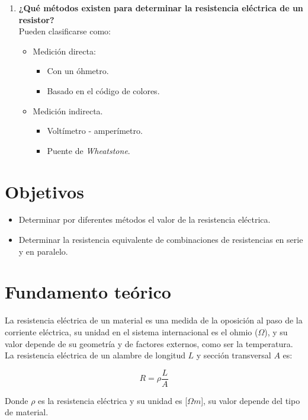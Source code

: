 \documentclass[letter,11pt]{article}
\begin{document}
\begin{enumerate}
\item \textbf{¿Qué métodos existen para determinar la resistencia eléctrica de
un resistor?} \\
Pueden clasificarse como:
\begin{itemize}
    \item Medición directa:
    \begin{itemize}
        \item Con un óhmetro.
        \item Basado en el código de colores.
    \end{itemize}
    \item Medición indirecta.
    \begin{itemize}
        \item Voltímetro - amperímetro.
        \item Puente de \emph{Wheatstone}.
    \end{itemize}
\end{itemize}

\end{enumerate}

\section{Objetivos}
\begin{itemize}
\item Determinar por diferentes métodos el valor de la resistencia eléctrica.
\item Determinar la resistencia equivalente de combinaciones de resistencias en
    serie y en paralelo.
\end{itemize}

\section{Fundamento teórico}

La resistencia eléctrica de un material es una medida de la oposición al paso de
la corriente eléctrica, su unidad en el sistema internacional es el ohmio
($\Omega$), y su valor depende de su geometría y de factores externos, como ser
la temperatura. La resistencia eléctrica de un alambre de longitud $L$ y sección
transversal $A$ es:

\begin{equation}
    R = \rho \frac{L}{A}
\label{resistividad}
\end{equation}

Donde $\rho$ es la resistencia eléctrica y su unidad es [$\Omega m$], su valor
depende del tipo de material.
\end{document}
